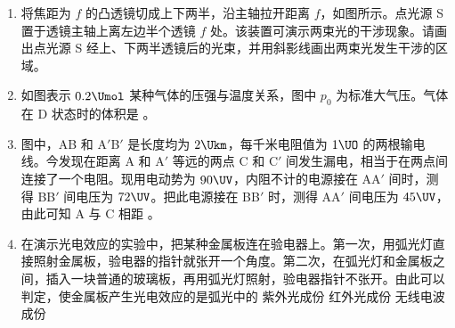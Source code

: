 \documentclass[\gkver]{gaokaozhenti}
\begin{document}
\begin{enumerate}
\item
将焦距为 $f$ 的凸透镜切成上下两半，沿主轴拉开距离 $f$，如图所示。点光源 S 置于透镜主轴上离左边半个透镜 $f$ 处。该装置可演示两束光的干涉现象。请画出点光源 S 经上、下两半透镜后的光束，并用斜影线画出两束光发生干涉的区域。
\drawpicanswer{\onepicture[align=right, w=10cm]{}}{\onepicture[align=right, w=11cm]{}}

\item
如图表示 $0.2\Umol$ 某种气体的压强与温度关系，图中 $p_{0}$ 为标准大气压。气体在 D 状态时的体积是 \tkanswer{$5.6\UL$}。
\onepicture[align=right, w=7cm]{}
\jdanswer{
$5.6\UL$
}

\item
图中，AB 和 A$'$B$'$ 是长度均为 $2\Ukm$，每千米电阻值为 $1\UO$ 的两根输电线。今发现在距离 A 和 A$'$ 等远的两点 C 和 C$'$ 间发生漏电，相当于在两点间连接了一个电阻。现用电动势为 $90\UV$，内阻不计的电源接在 AA$'$ 间时，测得 BB$'$ 间电压为 $72\UV$。把此电源接在 BB$'$ 时，测得 AA$'$ 间电压为 $45\UV$，由此可知 A 与 C 相距 \tkanswer{$0.4\Ukm$}。
\onepicture[align=right, w=7.5cm]{}
\jdanswer{
$0.4\Ukm$
}

\item
在演示光电效应的实验中，把某种金属板连在验电器上。第一次，用弧光灯直接照射金属板，验电器的指针就张开一个角度。第二次，在弧光灯和金属板之间，插入一块普通的玻璃板，再用弧光灯照射，验电器指针不张开。由此可以判定，使金属板产生光电效应的是弧光中的
{紫外光成份}
{红外光成份}
{无线电波成份}


\end{enumerate}
\end{document}
